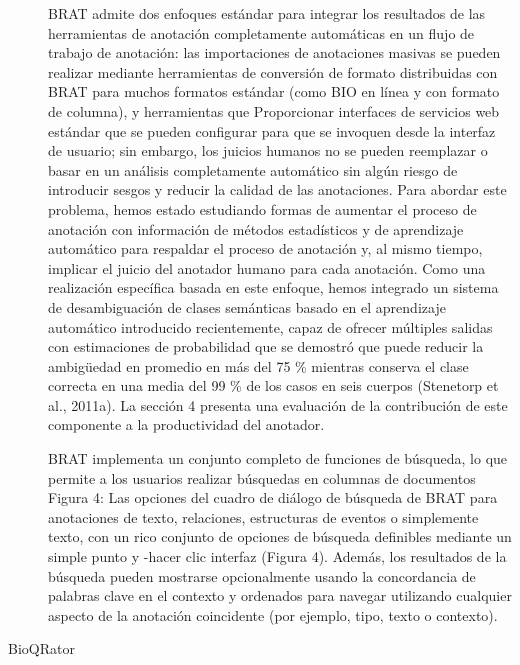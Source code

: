 \begin{description}
BRAT admite dos enfoques estándar para integrar los resultados de las herramientas de anotación completamente automáticas en un flujo de trabajo de anotación: las importaciones de anotaciones masivas se pueden realizar mediante herramientas de conversión de formato distribuidas con BRAT para muchos formatos estándar (como BIO en línea y con formato de columna), y herramientas que Proporcionar interfaces de servicios web estándar que se pueden configurar para que se invoquen desde la interfaz de usuario; sin embargo, los juicios humanos no se pueden reemplazar o basar en un análisis completamente automático sin algún riesgo de introducir sesgos y reducir la calidad de las anotaciones. Para abordar este problema, hemos estado estudiando formas de aumentar el proceso de anotación con información de métodos estadísticos y de aprendizaje automático para respaldar el proceso de anotación y, al mismo tiempo, implicar el juicio del anotador humano para cada anotación. Como una realización específica basada en este enfoque, hemos integrado un sistema de desambiguación de clases semánticas basado en el aprendizaje automático introducido recientemente, capaz de ofrecer múltiples salidas con estimaciones de probabilidad que se demostró que puede reducir la ambigüedad en promedio en más del 75 \% mientras conserva el clase correcta en una media del 99 \% de los casos en seis cuerpos (Stenetorp et al., 2011a). La sección 4 presenta una evaluación de la contribución de este componente a la productividad del anotador.

BRAT implementa un conjunto completo de funciones de búsqueda, lo que permite a los usuarios realizar búsquedas en columnas de documentos Figura 4: Las opciones del cuadro de diálogo de búsqueda de BRAT para anotaciones de texto, relaciones, estructuras de eventos o simplemente texto, con un rico conjunto de opciones de búsqueda definibles mediante un simple punto y -hacer clic
interfaz (Figura 4). Además, los resultados de la búsqueda pueden mostrarse opcionalmente usando la concordancia de palabras clave en el contexto y ordenados para navegar
utilizando cualquier aspecto de la anotación coincidente (por ejemplo, tipo, texto o contexto).

\item[BioQRator]


\end{description}
